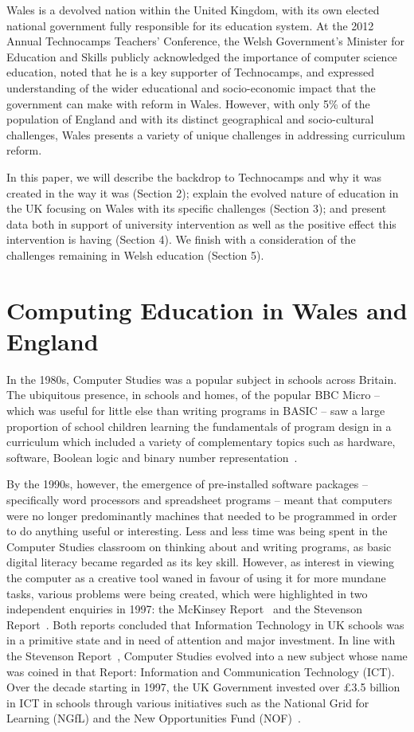 \documentclass{sig-alternate}
\begin{document}
Wales is a devolved nation within the United Kingdom, with its own
elected national government fully responsible for its education system.
At the 2012 Annual Technocamps Teachers' Conference,
the Welsh Government's Minister for Education and Skills
publicly acknowledged the importance of computer science education,
noted that he is a key supporter of Technocamps,
and expressed understanding of the wider educational and
socio-economic impact that the government can make with reform in Wales.
However, with only 5\% of the population of England and with its distinct
geographical and socio-cultural challenges, Wales presents
a variety of unique challenges in addressing curriculum reform.

In this paper, we will describe
the backdrop to Technocamps and why it was created in the way it was
(Section 2);
explain the evolved nature of education
in the UK focusing on Wales with its specific
challenges (Section 3);
and present data both in support of
university intervention as well as
the positive effect this intervention is having (Section 4).
We finish with a consideration of the challenges remaining
in Welsh education (Section 5).

\section{Computing Education in Wales and England}

In the 1980s, Computer Studies was a popular subject
in schools across Britain. The ubiquitous presence, in schools and homes,
of the popular BBC Micro -- which was useful for little else than
writing programs in BASIC -- saw a large proportion
of school children learning the fundamentals of program design
in a curriculum which included a variety of complementary
topics such as hardware, software, Boolean logic
and binary number representation~\cite{Doyle:1988}.

By the 1990s, however, the emergence of pre-installed software packages
-- specifically word processors and spreadsheet programs -- meant
that computers were no longer predominantly machines that
needed to be programmed in order to do anything useful or interesting.
Less and less time was being spent in the Computer Studies
classroom on thinking about and writing programs,
as basic digital literacy became regarded as its key skill.
However, as interest in viewing the computer as a creative tool
waned in favour of using it for more mundane tasks,
various problems were being created, which were highlighted in
two independent enquiries in 1997: the McKinsey Report~\cite{McKinsey:1997}
and the Stevenson Report~\cite{Stevenson:1997}.
Both reports concluded that
Information Technology in UK schools was in a primitive state
and in need of attention and major investment.
In line with the Stevenson Report~\cite{Stevenson:1997},
Computer Studies evolved into
a new subject whose name was coined in that Report:
Information and Communication Technology (ICT).
Over the decade starting in 1997, the UK Government invested
over \pounds3.5 billion in ICT in schools through various initiatives
such as the National Grid for Learning (NGfL)
and the New Opportunities Fund (NOF)~\cite{Doughty:2006}.
\end{document}
